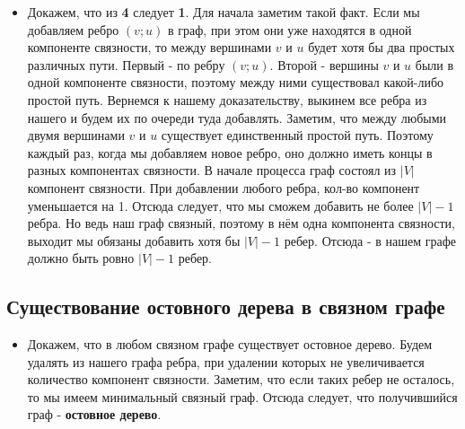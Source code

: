 \begin{itemize}
\begin{itemize}
    \item
    Докажем, что из \textbf{4} следует \textbf{1}. Для начала заметим такой факт. Если мы добавляем ребро $(v; u)$ в граф, при этом они уже находятся в одной компоненте связности, то между вершинами $v$ и $u$ будет хотя бы два простых различных пути. Первый - по ребру $(v; u)$. Второй - вершины $v$ и $u$ были в одной компоненте связности, поэтому между ними существовал какой-либо простой путь. Вернемся к нашему доказательству, выкинем все ребра из нашего и будем их по очереди туда добавлять. Заметим, что между любыми двумя вершинами $v$ и $u$ существует единственный простой путь. Поэтому каждый раз, когда мы добавляем новое ребро, оно должно иметь концы в разных компонентах связности. В начале процесса граф состоял из $|V|$ компонент связности. При добавлении любого ребра, кол-во компонент уменьшается на 1. Отсюда следует, что мы сможем добавить не более $|V| - 1$ ребра. Но ведь наш граф связный, поэтому в нём одна компонента связности, выходит мы обязаны добавить хотя бы $|V| - 1$ ребер. Отсюда - в нашем графе должно быть ровно $|V| - 1$ ребер.
    \end{itemize}
\end{itemize}

\subsection{Существование остовного дерева в связном графе}
\begin{itemize}
    \item Докажем, что в любом связном графе существует остовное дерево. Будем удалять из нашего графа ребра, при удалении которых не увеличивается количество компонент связности. Заметим, что если таких ребер не осталось, то мы имеем минимальный связный граф. Отсюда следует, что получившийся граф - \textbf{остовное дерево}.
\end{itemize}
